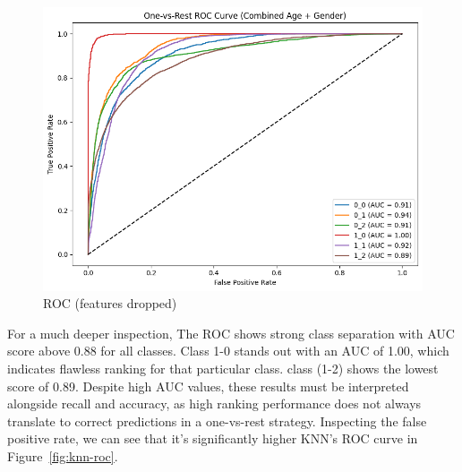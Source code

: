 \documentclass[10pt,twocolumn]{article}
\begin{document}
\begin{figure}[H]
    \centering
    \includegraphics[width=1\linewidth]{images/lr/roc-liblinear-l1-normal-training.png}
    \caption{ROC (features dropped)}
    \label{fig:roc-reduced-data}
\end{figure}
For a much deeper inspection, The ROC shows strong class separation with AUC score above 0.88 for all classes. Class 1-0 stands out with an AUC of 1.00, which indicates flawless ranking for that particular class. class (1-2) shows the lowest score of 0.89. Despite high AUC values, these results must be interpreted alongside recall and accuracy, as high ranking performance does not always translate to correct predictions in a one-vs-rest strategy. Inspecting the false positive rate, we can see that it's significantly higher KNN's ROC curve in Figure~\ref{fig:knn-roc}.
\end{document}
